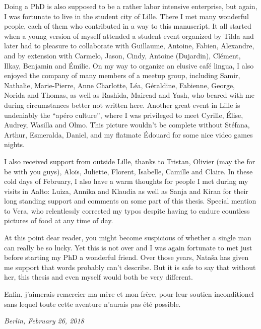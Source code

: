 Doing a PhD is also supposed to be a rather labor intensive enterprise, but
again, I was fortunate to live in the student city of Lille. There I met many
wonderful people, each of them who contributed in a way to this manuscript.  It
all started when a young version of myself attended a student event organized
by Tilda and later had to pleasure to collaborate with Guillaume, Antoine,
Fabien, Alexandre, and by extension with Carmelo, Jason, Cindy, Antoine
(Dujardin), Clément, Ilkay, Benjamin and Émilie. On my way to organize an
elusive café lingua, I also enjoyed the company of many members of a meetup
group, including Samir, Nathalie, Marie-Pierre, Anne Charlotte, Léa, Géraldine,
Fabienne, George, Norida and Thomas, as well as Rashida, Mairead and Yash, who
beared with me during circumstances better not written here. Another great
event in Lille is undeniably the \enquote{apéro culture}, where I was
privileged to meet Cyrille, Élise, Audrey, Wasilla and Olmo.  This picture
wouldn't be complete without Stéfana, Arthur, Esmeralda, Daniel, and my
flatmate Édouard for some nice video games nights.

I also received support from outside Lille, thanks to Tristan, Olivier (may the
for be with you guys), Aloïs, Juliette, Florent, Isabelle, Camille and Claire.
In these cold days of February, I also have a warm thoughts for people I met
during my visits in Aalto: Luiza, Annika and Klaudia as well as Sanja and Kiran
for their long standing support and comments on some part of this thesis.
Special mention to Vera, who relentlessly corrected my typos despite having to
endure countless pictures of food at any time of day.

At this point dear reader, you might become suspicious of whether a single man
can really be so lucky. Yet this is not over and I was again fortunate to met
just before starting my PhD a wonderful friend. Over those years, Nataša has
given me support that words probably can't describe. But it is safe to say that
without her, this thesis and even myself would both be very different.

\begin{otherlanguage}{french}
Enfin, j'aimerais remercier ma mère et mon frère, pour leur soutien
inconditionel sans lequel toute cette aventure n'aurais pas été possible.
\end{otherlanguage}

\vspace{5\baselineskip}
\begin{flushright}
  {\itshape
    Berlin, February 26, 2018
  }
\end{flushright}

